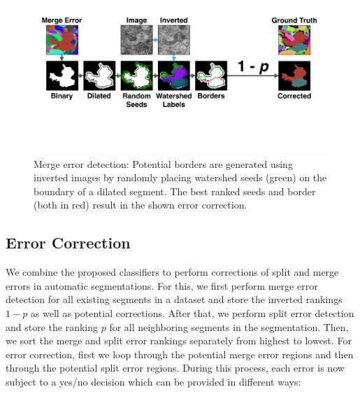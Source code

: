 
\begin{figure}[t]
\centering
\includegraphics[width=\linewidth]{gfx/merge_error_v6.pdf}
\caption{Merge error detection: Potential borders are generated using inverted images by randomly placing watershed seeds (green) on the boundary of a dilated segment. The best ranked seeds and border (both in red) result in the shown error correction.}
\label{fig:merge_error}
\vspace{-4mm}
\end{figure}

\subsection{Error Correction}
\label{sec:errorcorrection}

We combine the proposed classifiers to perform corrections of split and merge errors in automatic segmentations. For this, we first perform merge error detection for all existing segments in a dataset and store the inverted rankings $1-p$ as well as potential corrections. After that, we perform split error detection and store the ranking $p$ for all neighboring segments in the segmentation. Then, we sort the merge and split error rankings separately from highest to lowest. For error correction, first we loop through the potential merge error regions and then through the potential split error regions. During this process, each error is now subject to a yes/no decision which can be provided in different ways:

